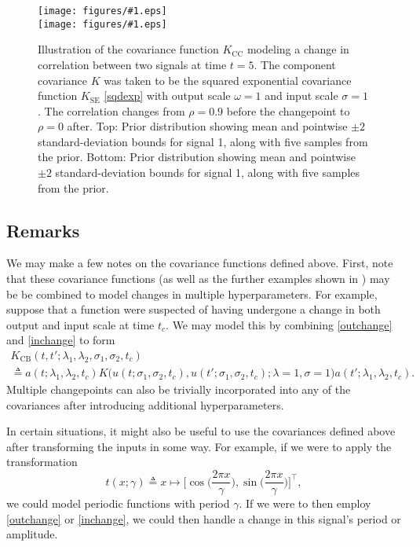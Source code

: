 \documentclass{article}
\newcommand{\deq}{\triangleq}
\newcommand{\psff}[1]{\texttt{[image: figures/\#1.eps]}}
\begin{document}
\begin{figure}
  \centering
  \psff{correlationcp_samples_1} \\
  \bigskip
  \psff{correlationcp_samples_2}\medskip
  \caption{Illustration of the covariance function $K_{\text{CC}}$
    modeling a change in correlation between two signals at time $t =
    \text{5}$.  The component covariance $K$ was taken to be the
    squared exponential covariance function $K_{\text{SE}}$
    \eqref{sqdexp} with output scale $\omega = 1$ and input scale
    $\sigma = 1$.  The correlation changes from $\rho = 0.9$ before
    the changepoint to $\rho = 0$ after. Top: Prior distribution
    showing mean and pointwise $\pm {2}$ standard-deviation
    bounds for signal 1, along with five samples from the prior.
    Bottom: Prior distribution showing mean and pointwise $\pm
    {2}$ standard-deviation bounds for signal 1, along with five
    samples from the prior.  }
  \label{fig:changecorrelation}
\end{figure}

\subsection{Remarks}

We may make a few notes on the covariance functions defined above.
First, note that these covariance functions (as well as the further
examples shown in \citep{cpcj, thesis}) may be be combined to model
changes in multiple hyperparameters.  For example, suppose that
a function were suspected of having undergone a change in both 
output and input scale at time $t_c$.  We may model this by combining
\eqref{outchange} and \eqref{inchange} to form
\begin{multline}
  \label{bothchange}
  K_{\text{CB}}
  (t, t'; \lambda_1, \lambda_2, \sigma_1, \sigma_2, t_c)
  \\
  \deq
  a(t; \lambda_1, \lambda_2, t_c)
  K
  \bigl(
    u(t; \sigma_1, \sigma_2, t_c),
    u(t'; \sigma_1, \sigma_2, t_c)
    ;
    \lambda = 1, \sigma = 1
  \bigr)
  a(t'; \lambda_1, \lambda_2, t_c).
\end{multline}
Multiple changepoints can also be trivially incorporated into any of
the covariances after introducing additional hyperparameters.

In certain situations, it might also be useful to use the covariances
defined above after transforming the inputs in some way.  For example,
if we were to apply the transformation
\begin{equation*}
  t(x; \gamma) 
  \deq 
  x 
  \mapsto 
  \Biggl[ 
    \cos \biggl( \frac{2 \pi x}{\gamma} \biggr),
    \sin \biggl( \frac{2 \pi x}{\gamma} \biggr)
  \Biggr]^\top,
\end{equation*}
we could model periodic functions with period $\gamma$.  If we were to
then employ \eqref{outchange} or \eqref{inchange}, we could then
handle a change in this signal's period or amplitude.
\end{document}
